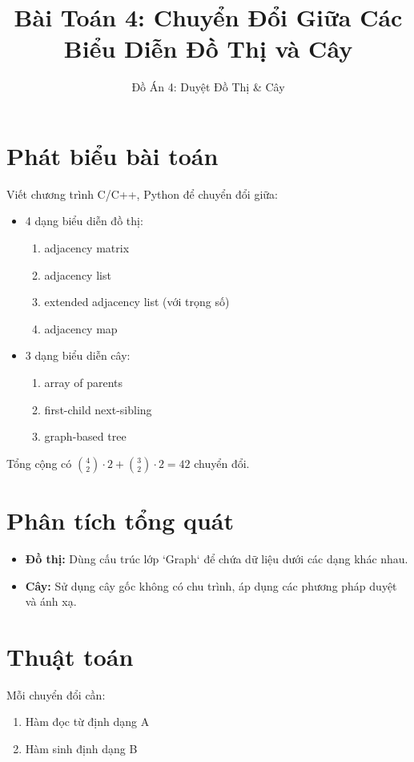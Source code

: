 \documentclass[12pt]{article}
\title{Bài Toán 4: Chuyển Đổi Giữa Các Biểu Diễn Đồ Thị và Cây}
\author{Đồ Án 4: Duyệt Đồ Thị & Cây}
\date{}
\begin{document}
\maketitle

\section*{Phát biểu bài toán}
Viết chương trình C/C++, Python để chuyển đổi giữa:
\begin{itemize}
    \item 4 dạng biểu diễn đồ thị: 
    \begin{enumerate}[label=(\alph*)]
        \item adjacency matrix
        \item adjacency list
        \item extended adjacency list (với trọng số)
        \item adjacency map
    \end{enumerate}
    \item 3 dạng biểu diễn cây:
    \begin{enumerate}[label=(\alph*)]
        \item array of parents
        \item first-child next-sibling
        \item graph-based tree
    \end{enumerate}
\end{itemize}

Tổng cộng có $\binom{4}{2} \cdot 2 + \binom{3}{2} \cdot 2 = 42$ chuyển đổi.

\section*{Phân tích tổng quát}
\begin{itemize}
    \item \textbf{Đồ thị:} Dùng cấu trúc lớp `Graph` để chứa dữ liệu dưới các dạng khác nhau.
    \item \textbf{Cây:} Sử dụng cây gốc không có chu trình, áp dụng các phương pháp duyệt và ánh xạ.
\end{itemize}

\section*{Thuật toán}
Mỗi chuyển đổi cần:
\begin{enumerate}
    \item Hàm đọc từ định dạng A
    \item Hàm sinh định dạng B
\end{enumerate}
\end{document}
